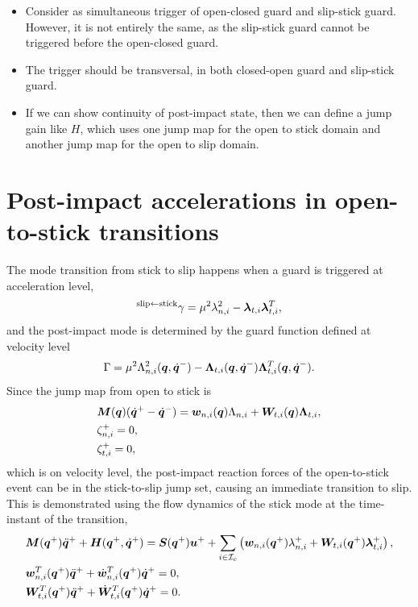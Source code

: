 \documentclass[../DC2017114Bouma.tex]{subfiles}
\begin{document}
\begin{itemize}
	\item Consider as simultaneous trigger of open-closed guard and slip-stick guard. However, it is not entirely the same, as the slip-stick guard cannot be triggered before the open-closed guard.
	\item The trigger should be transversal, in both closed-open guard and slip-stick guard.
	\item If we can show continuity of post-impact state, then we can define a jump gain like $H$, which uses one jump map for the open to stick domain and another jump map for the open to slip domain.
\end{itemize}

\section{Post-impact accelerations in open-to-stick transitions}
The mode transition from stick to slip happens when a guard is triggered at acceleration level, 
\begin{align}
^{\text{slip}\leftarrow\text{stick}}\gamma = \mu^2\lambda_{n,i}^2 - \boldsymbol{\lambda}_{t,i}\boldsymbol{\lambda}_{t,i}^T,
\end{align}
and the post-impact mode is determined by the guard function defined at velocity level
\begin{align}
\Gamma = \mu^2 \Lambda_{n,i}^2({\boldsymbol{q}},\dot{{\boldsymbol{q}}}^-) - \boldsymbol{\Lambda}_{t,i}({\boldsymbol{q}},\dot{{\boldsymbol{q}}}^-)\boldsymbol{\Lambda}_{t,i}^T({\boldsymbol{q}},\dot{{\boldsymbol{q}}}^-). \label{eq:appopentostick}
\end{align}
Since the jump map from open to stick is
\begin{align}
&{\boldsymbol{M}}({\boldsymbol{q}})(\dot{{\boldsymbol{q}}}^+ - \dot{{\boldsymbol{q}}}^-) = {\boldsymbol{w}}_{n,i}({\boldsymbol{q}})\Lambda_{n,i} + {\boldsymbol{W}}_{t,i}({\boldsymbol{q}})\boldsymbol{\Lambda}_{t,i},\label{eq:appjump8}\\
&\zeta_{n,i}^+ = 0,\label{eq:appjump9}\\
&\zeta_{t,i}^+ = 0,\label{eq:appjump10}
\end{align}
which is on velocity level, the post-impact reaction forces of the open-to-stick event can be in the stick-to-slip jump set, causing an immediate transition to slip. This is demonstrated using the flow dynamics of the stick mode at the time-instant of the transition,
\begin{align}
&{\boldsymbol{M}}({\boldsymbol{q}}^+)\ddot{{\boldsymbol{q}}}^+ + {\boldsymbol{H}}({\boldsymbol{q}}^+,\dot{{\boldsymbol{q}}}^+) = {\boldsymbol{S}}({\boldsymbol{q}}^+){\boldsymbol{u}}^+ + \sum_{i\in\mathcal{I}_c}\left({\boldsymbol{w}}_{n,i}({\boldsymbol{q}}^+)\lambda^+_{n,i} + {\boldsymbol{W}}_{t,i}({\boldsymbol{q}}^+)\boldsymbol{\lambda}^+_{t,i} \right), \label{eq:appstickdyn1}\\
&{\boldsymbol{w}}^T_{n,i}({\boldsymbol{q}}^+)\ddot{{\boldsymbol{q}}}^+ + \dot{{\boldsymbol{w}}}^T_{n,i}({\boldsymbol{q}}^+)\dot{{\boldsymbol{q}}}^+ = 0,\label{eq:appstickdyn2}\\
&{\boldsymbol{W}}^T_{t,i}({\boldsymbol{q}}^+)\ddot{{\boldsymbol{q}}}^+ + \dot{{\boldsymbol{W}}}^T_{t,i}({\boldsymbol{q}}^+)\dot{{\boldsymbol{q}}}^+ = 0.\label{eq:appstickdyn3}
\end{align}
\end{document}
